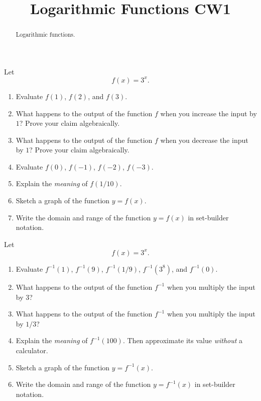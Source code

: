 \documentclass{ximera}
\title{Logarithmic Functions CW1}
\begin{document}
\begin{abstract}
Logarithmic functions.
\end{abstract}
\maketitle

\begin{question} \label{QOFf3rbg3}
Let 
\[
     f(x) = 3^x .
\]

\begin{enumerate}
\item Evaluate $f(1)$, $f(2)$, and $f(3)$.

\item What happens to the output of the function $f$ when you increase the input by $1$? Prove your claim algebraically.

\item What happens to the output of the function $f$ when you decrease the input by $1$? Prove your claim algebraically.

\item Evaluate $f(0)$, $f(-1)$, $f(-2)$, $f(-3)$.

\item Explain the \emph{meaning} of $f(1/10)$.

\item Sketch a graph of the function $y=f(x)$.

\item Write the domain and range of the function $y=f(x)$ in set-builder notation.

\end{enumerate}
\end{question}

\begin{question}  \label{Q3r3f3rfef}

Let 
\[
     f(x) = 3^x .
\]

\begin{enumerate}
\item Evaluate $f^{-1}(1)$, $f^{-1}(9)$, $f^{-1}(1/9)$, $f^{-1}(3^8)$, and $f^{-1}(0)$.

\item What happens to the output of the function $f^{-1}$ when you multiply the input by $3$? %

\item What happens to the output of the function $f^{-1}$ when you multiply the input by $1/3$? %

\item Explain the \emph{meaning} of $f^{-1}(100)$. Then approximate its value \emph{without} a calculator.

\item Sketch a graph of the function $y=f^{-1}(x)$.

\item Write the domain and range of the function $y=f^{-1}(x)$ in set-builder notation.

\end{enumerate}
\end{question}
\end{document}
